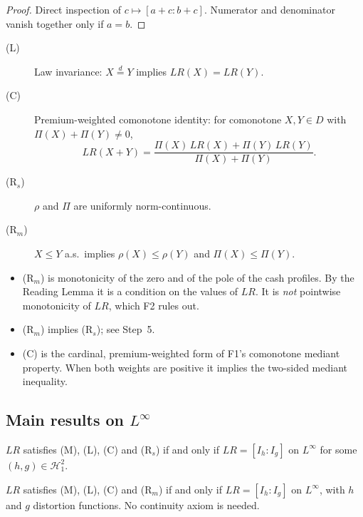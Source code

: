\begin{proof}
Direct inspection of $c\mapsto[a+c:b+c]$. Numerator and denominator vanish together only if $a=b$.
\end{proof}

\begin{definition}
\begin{description}
\item[(L)] Law invariance: $X\overset{d}{=}Y$ implies $LR(X)=LR(Y)$.
\item[(C)] Premium-weighted comonotone identity: for comonotone $X,Y\in D$ with $\Pi(X)+\Pi(Y)\neq 0$,
\[
LR(X+Y)=\frac{\Pi(X)\,LR(X)+\Pi(Y)\,LR(Y)}{\Pi(X)+\Pi(Y)} .
\]
\item[(R$_s$)] $\rho$ and $\Pi$ are uniformly norm-continuous.
\item[(R$_m$)] $X\le Y$ a.s.\ implies $\rho(X)\le\rho(Y)$ and $\Pi(X)\le\Pi(Y)$.
\end{description}
\end{definition}

\begin{remark}
\begin{itemize}
\item (R$_m$) is monotonicity of the zero and of the pole of the cash profiles. By the Reading Lemma it is a condition on the values of $LR$. It is \emph{not} pointwise monotonicity of $LR$, which F2 rules out.
\item (R$_m$) implies (R$_s$); see Step~5.
\item (C) is the cardinal, premium-weighted form of F1's comonotone mediant property. When both weights are positive it implies the two-sided mediant inequality.
\end{itemize}
\end{remark}

\subsection{Main results on $L^\infty$}

\begin{theorem}
$LR$ satisfies (M), (L), (C) and (R$_s$) if and only if $LR=[I_h:I_g]$ on $L^\infty$ for some $(h,g)\in\mathcal H_1^2$.
\end{theorem}

\begin{theorem}
$LR$ satisfies (M), (L), (C) and (R$_m$) if and only if $LR=[I_h:I_g]$ on $L^\infty$, with $h$ and $g$ distortion functions. No continuity axiom is needed.
\end{theorem}

